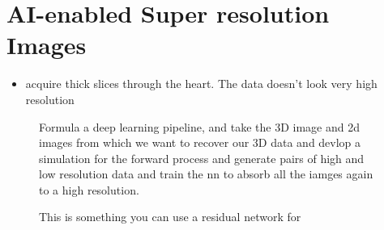 \documentclass[11pt]{article}
\begin{document}
\section{AI-enabled Super resolution Images}

\begin{minipage}[l]{.5\linewidth}
    \begin{figure}[H]
        \centering
    \end{figure}    
\end{minipage}\hfill
\begin{minipage}[r]{.48\linewidth}
    \begin{itemize}
        \item acquire thick slices through the heart. The data doesn't look very high resolution
    \end{itemize}
\end{minipage}

\begin{figure}[H]
    \centering
    \caption*{Formula a deep learning pipeline, and take the 3D image and 2d images from which we want to recover our 3D data and devlop a simulation for the forward process and generate pairs of high and low resolution data and train the nn to absorb all the iamges again to a high resolution.}
\end{figure}   

\begin{figure}[H]
    \centering
    \caption*{This is something you can use a residual network for}
\end{figure}  

\printbibliography
{}
\end{document}

